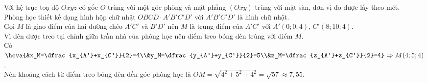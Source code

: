 \begin{ex}
{\begin{center}
		 \end{center}
		Với hệ trục toạ độ $Oxyz$ có gốc $O$ trùng với một góc phòng và mặt phẳng $(Oxy)$ trùng với mặt sàn, đơn vị đo được lấy theo mét.\\
		Phòng học thiết kế dạng hình hộp chữ nhật $OBCD\cdot A'B'C'D'$ với $A'B'C'D'$ là hình chữ nhật.\\
		Gọi $M$ là giao điểm của hai đường chéo $A'C'$ và $B'D'$ nên $M$ là trung điểm của $A'C'$ với $A'(0;0;4)$, $C'(8;10;4)$.\\
		Vì đèn được treo tại chính giữa trần nhà của phòng học nên điểm treo bóng đèn trùng với điểm $M$.\\
		Có $\heva{&x_M=\dfrac{x_{A'}+x_{C'}}{2}=4\\&y_M=\dfrac{y_{A'}+y_{C'}}{2}=5\\&z_M=\dfrac{z_{A'}+z_{C'}}{2}=4}\Rightarrow M(4;5;4)$.\\
		Nên khoảng cách từ điểm treo bóng đèn đến góc phòng học là $OM=\sqrt{4^2+5^2+4^2}=\sqrt{57}\approx7{,}55$.}
\end{ex}

